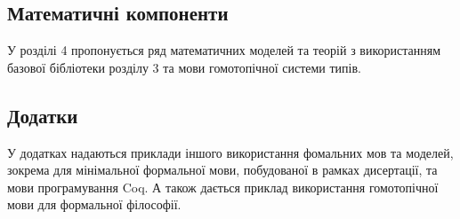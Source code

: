 \subsection{Математичні компоненти}
У розділі 4 пропонується ряд математичних моделей та теорій з використанням
базової бібліотеки розділу 3 та мови гомотопічної системи типів.

\subsection*{Додатки}

У додатках надаються приклади іншого використання фомальних мов та моделей,
зокрема для мінімальної формальної мови, побудованої в рамках дисертації,
та мови програмування Coq. А також дається приклад використання
гомотопічної мови для формальної філософії.

